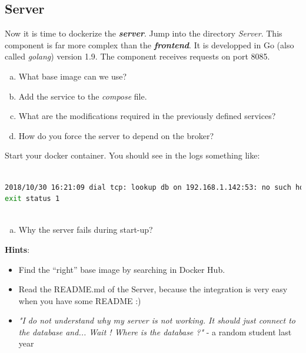 \documentclass[a4paper,11pt]{exam}
\begin{document}
\subsection{Server}
	\begin{questions}

	\question Now it is time to dockerize the \textit{\textbf{server}}. Jump into the directory \textit{Server}. This component is far more complex than the \textit{\textbf{frontend}}. It is developped in Go (also called \textit{golang}) version 1.9. The component receives requests on port 8085.
	
	\begin{enumerate}[(a)] %
		\item What base image can we use?
		\item Add the service to the \textit{compose} file.
		\item What are the modifications required in the previously defined services?
		\item How do you force the server to depend on the broker?
	\end{enumerate}
	Start your docker container. You should see in the logs something like: 
	\begin{lstlisting}[frame=single,language={sh}]  % Start your code-block
	
2018/10/30 16:21:09 dial tcp: lookup db on 192.168.1.142:53: no such host
exit status 1
		
	\end{lstlisting}
	\begin{enumerate}[(e)]
		\item Why the server fails during start-up?
	\end{enumerate}
	
	\textbf{Hints}:
	\begin{itemize}
		\item Find the ``right'' base image by searching in Docker Hub.
		\item Read the README.md of the Server, because the integration is very easy when you have some README :)
		\item \textit{"I do not understand why my server is not working. It should just connect to the database and... Wait ! Where is the database ?"} - a random student last year
	\end{itemize}
	\end{questions}
\end{document}

